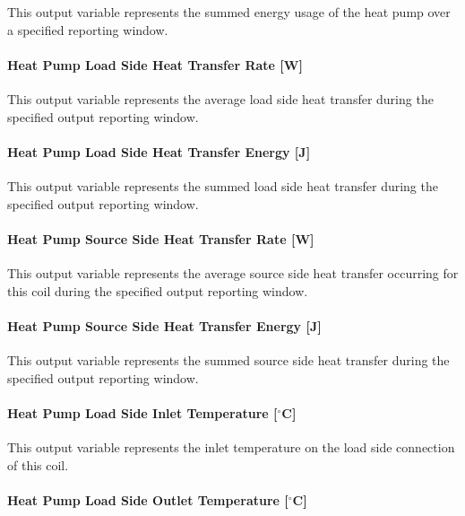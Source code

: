 This output variable represents the summed energy usage of the heat pump over a specified reporting window.

\paragraph{Heat Pump Load Side Heat Transfer Rate {[}W{]}}\label{plhp_eir_outputs_q_load}

This output variable represents the average load side heat transfer during the specified output reporting window.

\paragraph{Heat Pump Load Side Heat Transfer Energy {[}J{]}}\label{plhp_eir_outputs_q_load_sum}

This output variable represents the summed load side heat transfer during the specified output reporting window.

\paragraph{Heat Pump Source Side Heat Transfer Rate {[}W{]}}\label{plhp_eir_outputs_q_source}

This output variable represents the average source side heat transfer occurring for this coil during the specified output reporting window.

\paragraph{Heat Pump Source Side Heat Transfer Energy {[}J{]}}\label{plhp_eir_outputs_q_src_sum}

This output variable represents the summed source side heat transfer during the specified output reporting window.

\paragraph{Heat Pump Load Side Inlet Temperature {[}$^\circ$C{]}}\label{plhp_eir_outputs_t_load_in}

This output variable represents the inlet temperature on the load side connection of this coil.

\paragraph{Heat Pump Load Side Outlet Temperature {[}$^\circ$C{]}}\label{plhp_eir_outputs_t_load_out}

